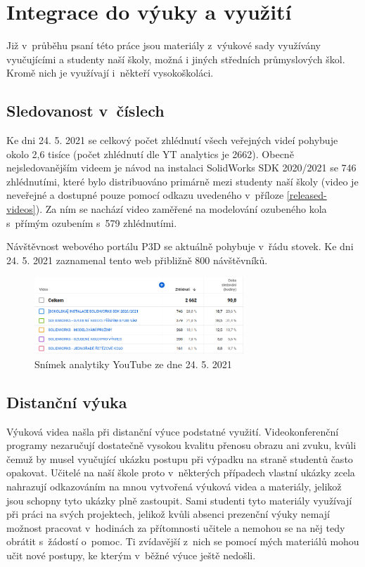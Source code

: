\chapter{Integrace do výuky a využití}
Již v~průběhu psaní této práce jsou materiály z~výukové sady využívány vyučujícími a studenty naší školy, možná i jiných středních průmyslových škol.
Kromě nich je využívají i~někteří vysokoškoláci.

\section{Sledovanost v~číslech}
Ke dni 24. 5. 2021 se celkový počet zhlédnutí všech veřejných videí pohybuje okolo 2,6 tisíce (počet zhlédnutí dle YT analytics je 2662).
Obecně nejsledovanějším videem je návod na instalaci SolidWorks SDK 2020/2021 se 746 zhlédnutími, které bylo distribuováno primárně mezi studenty naší školy (video je neveřejné a dostupné pouze pomocí odkazu uvedeného v~příloze \ref{released-videos}).
Za ním se nachází video zaměřené na modelování ozubeného kola s~přímým ozubením s~579 zhlédnutími.

Návštěvnost webového portálu P3D se aktuálně pohybuje v~řádu stovek.
Ke dni 24. 5. 2021 zaznamenal tento web přibližně 800 návštěvníků.

\begin{figure}
    \centering
    \includegraphics[width=0.7\textwidth]{img/020/yt-analytics-24-05-21.png}
    \caption{Snímek analytiky YouTube ze dne 24. 5. 2021}
    \label{fig:yt-analytics}
\end{figure}

\section{Distanční výuka}
Výuková videa našla při distanční výuce podstatné využití.
Videokonferenční programy nezaručují dostatečně vysokou kvalitu přenosu obrazu ani zvuku, kvůli čemuž by musel vyučující ukázku postupu při výpadku na straně studentů často opakovat.
Učitelé na naší škole proto v~některých případech vlastní ukázky zcela nahrazují odkazováním na mnou vytvořená výuková videa a materiály, jelikož jsou schopny tyto ukázky plně zastoupit.
Sami studenti tyto materiály využívají při práci na svých projektech, jelikož kvůli absenci prezenční výuky nemají možnost pracovat v~hodinách za přítomnosti učitele a nemohou se na něj tedy obrátit s~žádostí o~pomoc.
Ti zvídavější z~nich se pomocí mých materiálů mohou učit nové postupy, ke kterým v~běžné výuce ještě nedošli.

